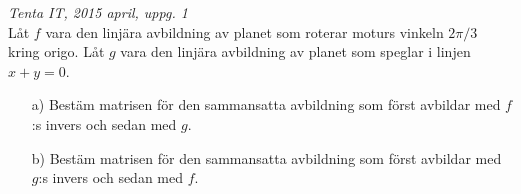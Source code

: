 {\it Tenta IT, 2015 april, uppg. 1}\\
Låt $f$ vara den linjära avbildning av planet som roterar moturs vinkeln $2\pi/3$ kring origo. Låt $g$ vara den linjära avbildning av planet som speglar i linjen $x+y=0$.
\begin{itemize}
	\item[a) ] Bestäm matrisen för den sammansatta avbildning som först avbildar med $f$:s invers och sedan med $g$.
	\item[b) ] Bestäm matrisen för den sammansatta avbildning som först avbildar med $g$:s invers och sedan med $f$.
\end{itemize}